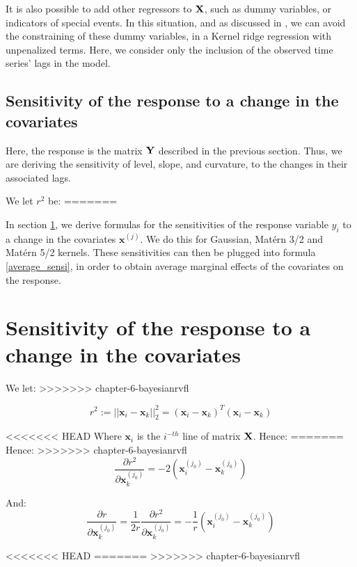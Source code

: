 It is also possible to add other regressors to ${\bf X}$, such as dummy variables, or indicators of special events. In this situation, and as discussed in \cite{exterkate2016nonlinear}, we can avoid the constraining of these dummy variables, in a Kernel ridge regression with unpenalized terms. Here, we consider only the inclusion of the observed time series' lags in the model.

\subsection{Sensitivity of the response to a change in the covariates}
\label{sec:sensitivity1}

Here, the response is the matrix ${\bf Y}$ described in the previous section. Thus, we are deriving the sensitivity of level, slope, and curvature, to the changes in their associated lags. 

\medskip

We let $r^2$ be:
=======
\medskip

In section \ref{sec:sensitivity}, we derive formulas for the sensitivities of the response variable $y_i$ to a change in the covariates $\textbf{x}^{(j)}$. We do this for Gaussian, Mat\'ern 3/2 and Mat\'ern 5/2 kernels. These sensitivities can then be plugged into formula \ref{average_sensi}, in order to obtain average marginal effects of the covariates on the response.

\section{Sensitivity of the response to a change in the covariates}
\label{sec:sensitivity}

We let:
>>>>>>> chapter-6-bayesianrvfl

$$
r^2 := || \textbf{x}_i - \textbf{x}_k ||^2_2 = (\textbf{x}_i - \textbf{x}_k)^T(\textbf{x}_i - \textbf{x}_k)
$$

<<<<<<< HEAD
Where $\textbf{x}_i$ is the $i^{-th}$ line of matrix ${\bf X}$. Hence:
=======
Hence:
>>>>>>> chapter-6-bayesianrvfl
$$
\frac{\partial r^2}{\partial \textbf{x}_k^{(j_0)}} = -2\left(\textbf{x}_i^{(j_0)} - \textbf{x}_k^{(j_0)} \right)
$$

And:
$$
\frac{\partial r}{\partial \textbf{x}_k^{(j_0)}} = \frac{1}{2r}\frac{\partial r^2}{\partial \textbf{x}_k^{(j_0)}} = -\frac{1}{r}\left(\textbf{x}_i^{(j_0)} - \textbf{x}_k^{(j_0)} \right)
$$

<<<<<<< HEAD
=======
\medskip
>>>>>>> chapter-6-bayesianrvfl

